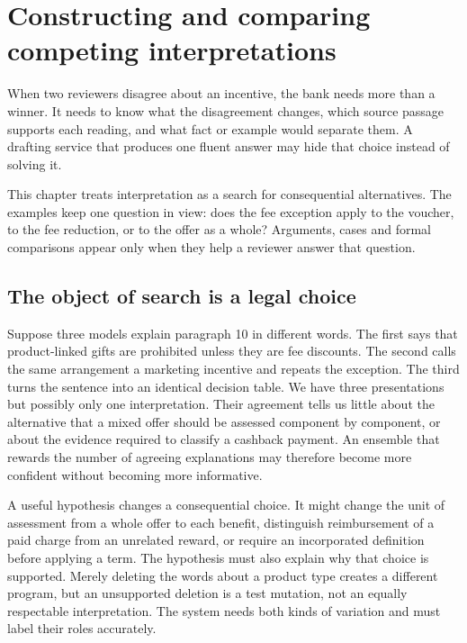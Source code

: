 \chapter{Constructing and comparing competing interpretations}
\label{ch:search}

When two reviewers disagree about an incentive, the bank needs more than a
winner. It needs to know what the disagreement changes, which source passage
supports each reading, and what fact or example would separate them. A drafting
service that produces one fluent answer may hide that choice instead of solving
it.

This chapter treats interpretation as a search for consequential alternatives.
The examples keep one question in view: does the fee exception apply to the
voucher, to the fee reduction, or to the offer as a whole? Arguments, cases and
formal comparisons appear only when they help a reviewer answer that question.


\section{The object of search is a legal choice}
\label{merge:M05:00}


Suppose three models explain paragraph 10 in different words. The first says that
product-linked gifts are prohibited unless they are fee discounts. The second
calls the same arrangement a marketing incentive and repeats the exception. The
third turns the sentence into an identical decision table. We have three
presentations but possibly only one interpretation. Their agreement tells us
little about the alternative that a mixed offer should be assessed component by
component, or about the evidence required to classify a cashback payment. An
ensemble that rewards the number of agreeing explanations may therefore become
more confident without becoming more informative.

A useful hypothesis changes a consequential choice. It might change the unit of
assessment from a whole offer to each benefit, distinguish reimbursement of a
paid charge from an unrelated reward, or require an incorporated definition
before applying a term. The hypothesis must also explain why that choice is
supported. Merely deleting the words about a product type creates a different
program, but an unsupported deletion is a test mutation, not an equally
respectable interpretation. The system needs both kinds of variation and must
label their roles accurately.

